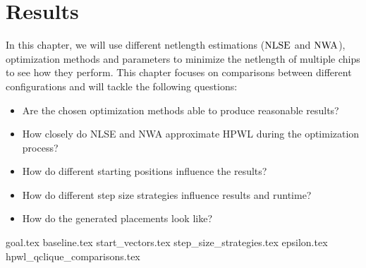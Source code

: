 \chapter{Results} \label{chap:results}

In this chapter, we will use different netlength estimations (\(\operatorname{NLSE}\) and \(\operatorname{NWA}\)),
optimization methods and parameters 
to minimize the netlength of multiple chips to see how they perform.
This chapter focuses on comparisons between different configurations and will tackle the following questions:
\begin{itemize}
 \item Are the chosen optimization methods able to produce reasonable results?
 \item How closely do NLSE and NWA approximate HPWL during the optimization process?
 \item How do different starting positions influence the results?
 \item How do different step size strategies influence results and runtime?
 \item How do the generated placements look like?
\end{itemize}

{goal.tex}
{baseline.tex}
{start_vectors.tex}
{step_size_strategies.tex}
{epsilon.tex}
{hpwl_qclique_comparisons.tex}
